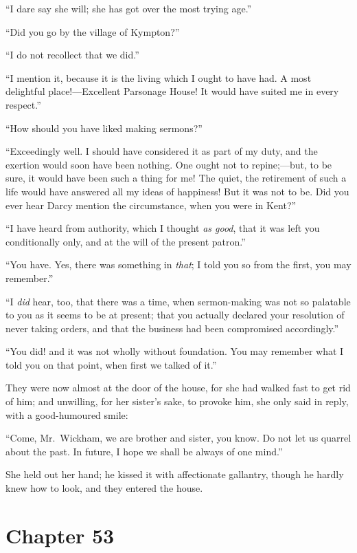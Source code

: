 ``I dare say she will; she has got over the most trying age.''

``Did you go by the village of Kympton?''

``I do not recollect that we did.''

``I mention it, because it is the living which I ought to have
had.  A most delightful place!---Excellent Parsonage House!
It would have suited me in every respect.''

``How should you have liked making sermons?''

``Exceedingly well.  I should have considered it as part of my
duty, and the exertion would soon have been nothing.  One ought
not to repine;---but, to be sure, it would have been such a
thing for me!  The quiet, the retirement of such a life would
have answered all my ideas of happiness!  But it was not to be.
Did you ever hear Darcy mention the circumstance, when you were
in Kent?''

``I have heard from authority, which I thought \emph{as good},
that it was left you conditionally only, and at the will of the
present patron.''

``You have.  Yes, there was something in \emph{that}; I told you so
from the first, you may remember.''

``I \emph{did} hear, too, that there was a time, when sermon-making
was not so palatable to you as it seems to be at present; that
you actually declared your resolution of never taking orders,
and that the business had been compromised accordingly.''

``You did! and it was not wholly without foundation.  You may
remember what I told you on that point, when first we talked
of it.''

They were now almost at the door of the house, for she
had walked fast to get rid of him; and unwilling, for her
sister's sake, to provoke him, she only said in reply, with
a good-humoured smile:

``Come, Mr.\ Wickham, we are brother and sister, you know.
Do not let us quarrel about the past.  In future, I hope we
shall be always of one mind.''

She held out her hand; he kissed it with affectionate gallantry,
though he hardly knew how to look, and they entered the house.



\chapter{Chapter 53}


